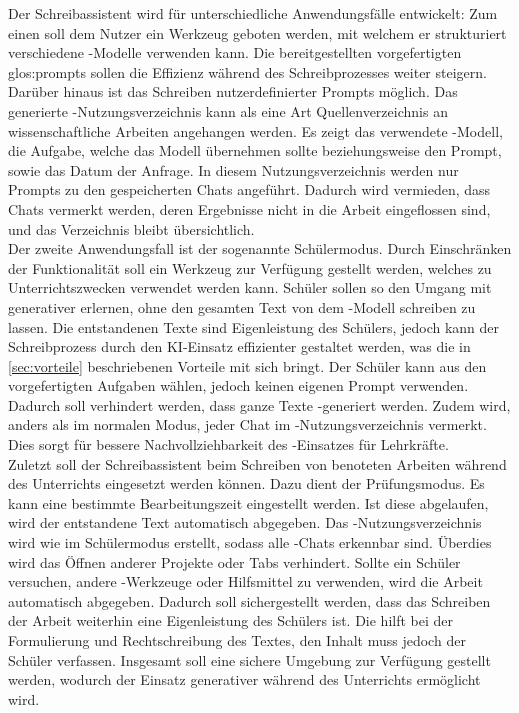 \documentclass[../main.tex]{subfiles}
\begin{document}
Der Schreibassistent wird für unterschiedliche Anwendungsfälle entwickelt: 
 Zum einen soll dem Nutzer ein Werkzeug geboten werden, mit welchem er strukturiert verschiedene -Modelle verwenden kann. Die bereitgestellten vorgefertigten \gls{glos:prompt}s sollen 
 die Effizienz während des Schreibprozesses weiter steigern. Darüber hinaus ist das Schreiben nutzerdefinierter Prompts möglich. Das generierte -Nutzungsverzeichnis kann als eine 
 Art Quellenverzeichnis an wissenschaftliche Arbeiten angehangen werden. Es zeigt das verwendete -Modell, die Aufgabe, welche das Modell übernehmen sollte 
 beziehungsweise den Prompt, sowie das Datum der Anfrage. In diesem Nutzungsverzeichnis werden nur Prompts zu den gespeicherten Chats angeführt. Dadurch wird vermieden, dass Chats 
 vermerkt werden, deren Ergebnisse nicht in die Arbeit eingeflossen sind, und das Verzeichnis bleibt übersichtlich.\\ 
 Der zweite Anwendungsfall ist der sogenannte Schülermodus. Durch 
 Einschränken der Funktionalität soll ein Werkzeug zur Verfügung gestellt werden, welches zu Unterrichtszwecken verwendet werden kann. Schüler sollen so den Umgang mit generativer 
  erlernen, ohne den gesamten Text von dem -Modell schreiben zu lassen. Die entstandenen Texte sind Eigenleistung des Schülers, jedoch kann der 
 Schreibprozess durch den KI-Einsatz effizienter gestaltet werden, was die in \autoref{sec:vorteile} beschriebenen Vorteile mit sich bringt. Der Schüler kann aus den vorgefertigten Aufgaben 
 wählen, jedoch keinen eigenen Prompt verwenden. Dadurch soll verhindert werden, dass ganze Texte -generiert werden. Zudem wird, anders als im normalen Modus, jeder 
 Chat im -Nutzungsverzeichnis vermerkt. Dies sorgt für bessere Nachvollziehbarkeit des -Einsatzes für Lehrkräfte.\\ 
 Zuletzt soll der Schreibassistent 
 beim Schreiben von benoteten Arbeiten während des Unterrichts eingesetzt werden können. Dazu dient der Prüfungsmodus. Es kann eine bestimmte Bearbeitungszeit eingestellt werden. 
 Ist diese abgelaufen, wird der entstandene Text automatisch abgegeben. Das -Nutzungsverzeichnis wird wie im Schülermodus erstellt, sodass alle -Chats 
 erkennbar sind. Überdies  wird das Öffnen anderer Projekte oder Tabs verhindert. Sollte ein Schüler versuchen, andere -Werkzeuge oder Hilfsmittel zu verwenden, 
 wird die Arbeit automatisch abgegeben. Dadurch soll sichergestellt werden, dass das Schreiben der Arbeit weiterhin eine Eigenleistung des Schülers ist. Die  hilft 
 bei der Formulierung und Rechtschreibung des Textes, den Inhalt muss jedoch der Schüler verfassen. Insgesamt soll eine sichere Umgebung zur Verfügung gestellt werden, wodurch der Einsatz 
 generativer  während des Unterrichts ermöglicht wird.
\end{document}
